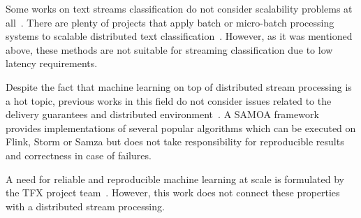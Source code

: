 \label{fs-related}

Some works on text streams classification do not consider scalability problems at all~\cite{zhang2008one}. There are plenty of projects that apply batch or micro-batch processing systems to scalable distributed text classification~\cite{semberecki2016distributed, 8029336, Nodarakis2016LargeSS, baltas2016apache, svyatkovskiy2016large, berral2015aloja}. However, as it was mentioned above, these methods are not suitable for streaming classification due to low latency requirements. 

Despite the fact that machine learning on top of distributed stream processing is a hot topic, previous works in this field do not consider issues related to the delivery guarantees and distributed environment~\cite{khumoyun2016real}. A SAMOA framework~\cite{morales2015samoa} provides implementations of several popular algorithms which can be executed on Flink, Storm or Samza but does not take responsibility for reproducible results and correctness in case of failures.

A need for reliable and reproducible machine learning at scale is formulated by the TFX project team~\cite{Baylor:2017:TTP:3097983.3098021}. However, this work does not connect these properties with a distributed stream processing. 